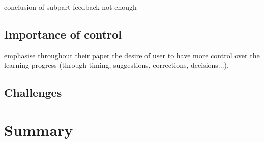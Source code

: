 conclusion of subpart
feedback not enough

\subsection{Importance of control}

\cite{amershi2014power} emphasise throughout their paper the desire of user to have more control over the learning progress (through timing, suggestions, corrections, decisions...).


\subsection{Challenges}



\section{Summary}
